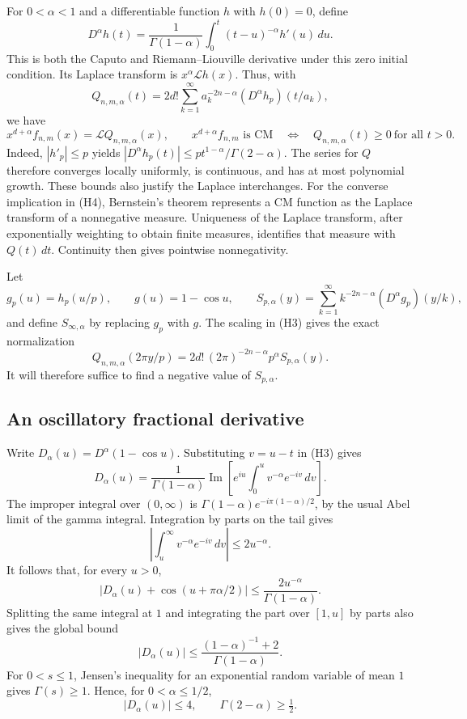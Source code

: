 \documentclass[11pt,a4paper]{article}
\theoremstyle{remark}
\begin{document}
For $0<\alpha<1$ and a differentiable function $h$ with $h(0)=0$, define
\[
 D^\alpha h(t)=\frac1{\Gamma(1-\alpha)}
 \int_0^t(t-u)^{-\alpha}h'(u)\,du.
\tag{H3}
\]
This is both the Caputo and Riemann--Liouville derivative under this
zero initial condition. Its Laplace transform is $x^\alpha\mathcal Lh(x)$.
Thus, with
\[
 Q_{n,m,\alpha}(t)
 =2d!\sum_{k=1}^\infty
 a_k^{-2n-\alpha}(D^\alpha h_p)(t/a_k),
\]
we have
\[
 x^{d+\alpha}f_{n,m}(x)=\mathcal L Q_{n,m,\alpha}(x),
 \qquad
 x^{d+\alpha}f_{n,m}\text{ is CM}
 \quad\Longleftrightarrow\quad
 Q_{n,m,\alpha}(t)\geq0\ \text{for all }t>0.
\tag{H4}
\]
Indeed, $|h'_p|\leq p$ yields
$|D^\alpha h_p(t)|\leq pt^{1-\alpha}/\Gamma(2-\alpha)$.
The series for $Q$ therefore converges locally uniformly, is continuous,
and has at most polynomial growth. These bounds also justify the Laplace
interchanges. For the converse implication in (H4), Bernstein's theorem
represents a CM function as the Laplace transform of a nonnegative
measure. Uniqueness of the Laplace transform, after exponentially
weighting to obtain finite measures, identifies that measure with
$Q(t)\,dt$. Continuity then gives pointwise nonnegativity.

Let
\[
 g_p(u)=h_p(u/p),\qquad g(u)=1-\cos u,
 \qquad
 S_{p,\alpha}(y)=\sum_{k=1}^\infty
 k^{-2n-\alpha}(D^\alpha g_p)(y/k),
\]
and define $S_{\infty,\alpha}$ by replacing $g_p$ with $g$.
The scaling in (H3) gives the exact normalization
\[
 Q_{n,m,\alpha}(2\pi y/p)
 =2d!\,(2\pi)^{-2n-\alpha}p^\alpha S_{p,\alpha}(y).
\tag{H5}
\]
It will therefore suffice to find a negative value of $S_{p,\alpha}$.

\subsection{An oscillatory fractional derivative}

Write $D_\alpha(u)=D^\alpha(1-\cos u)$. Substituting $v=u-t$ in
(H3) gives
\[
 D_\alpha(u)=\frac1{\Gamma(1-\alpha)}
 \operatorname{Im}\left[e^{iu}\int_0^u v^{-\alpha}e^{-iv}\,dv\right].
\]
The improper integral over $(0,\infty)$ is
$\Gamma(1-\alpha)e^{-i\pi(1-\alpha)/2}$, by the usual Abel limit of
the gamma integral. Integration by parts on the tail gives
\[
 \left|\int_u^\infty v^{-\alpha}e^{-iv}\,dv\right|
 \leq 2u^{-\alpha}.
\]
It follows that, for every $u>0$,
\[
 \left|D_\alpha(u)+\cos(u+\pi\alpha/2)\right|
 \leq\frac{2u^{-\alpha}}{\Gamma(1-\alpha)}.
\tag{H6}
\]
Splitting the same integral at $1$ and integrating the part over
$[1,u]$ by parts also gives the global bound
\[
 |D_\alpha(u)|\leq
 \frac{(1-\alpha)^{-1}+2}{\Gamma(1-\alpha)}.
\tag{H7}
\]
For $0<s\leq1$, Jensen's inequality for an exponential random variable
of mean $1$ gives $\Gamma(s)\geq1$. Hence, for $0<\alpha\leq1/2$,
\[
 |D_\alpha(u)|\leq4,
 \qquad \Gamma(2-\alpha)\geq\tfrac12.
\tag{H8}
\]
\end{document}

